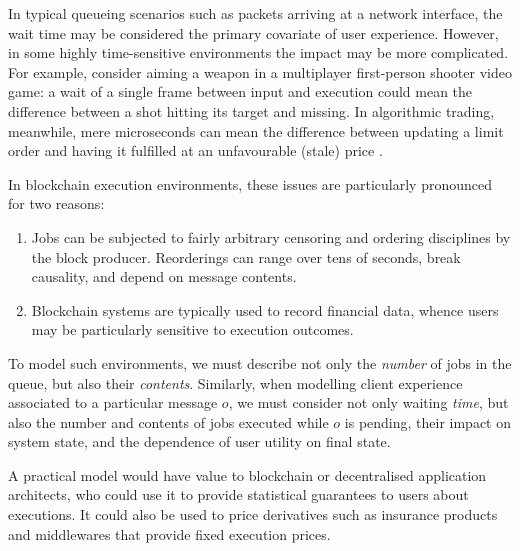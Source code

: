 \documentclass[a4paper,11pt]{article}
\begin{document}
In typical queueing scenarios such as packets arriving at a network interface, the wait time may be considered the primary covariate of user experience.
%
However, in some highly time-sensitive environments the impact may be more complicated. 
%
For example, consider aiming a weapon in a multiplayer first-person shooter video game: a wait of a single frame between input and execution could mean the difference between a shot hitting its target and missing.
%
In algorithmic trading, meanwhile, mere microseconds can mean the difference between updating a limit order and having it fulfilled at an unfavourable (stale) price \cite{budish2015high}.

In blockchain execution environments, these issues are particularly pronounced for two reasons: 
\begin{enumerate}
  \item Jobs can be subjected to fairly arbitrary censoring and ordering disciplines by the block producer. 
  Reorderings can range over tens of seconds, break causality, and depend on message contents.
  \item Blockchain systems are typically used to record financial data, whence users may be particularly sensitive to execution outcomes.
\end{enumerate}

To model such environments, we must describe not only the \emph{number} of jobs in the queue, but also their \emph{contents}. Similarly, when modelling client experience associated to a particular message $o$, we must consider not only waiting \emph{time}, but also the number and contents of jobs executed while $o$ is pending, their impact on system state, and the dependence of user utility on final state.

A practical model would have value to blockchain or decentralised application architects, who could use it to provide statistical guarantees to users about executions. It could also be used to price derivatives such as insurance products and middlewares that provide fixed execution prices.
\end{document}
